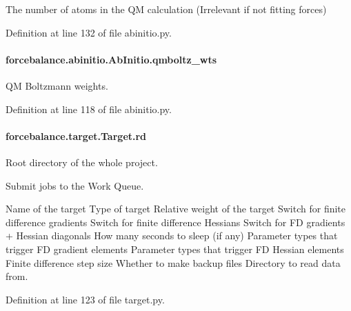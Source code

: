 The number of atoms in the Q\-M calculation (Irrelevant if not fitting forces) 



Definition at line 132 of file abinitio.\-py.

\hypertarget{classforcebalance_1_1abinitio_1_1AbInitio_a06ec6b12d81791ca94f599f41e56335a}{
\paragraph[{qmboltz\-\_\-wts}]{\setlength{\rightskip}{0pt plus 5cm}forcebalance.\-abinitio.\-Ab\-Initio.\-qmboltz\-\_\-wts}}\label{classforcebalance_1_1abinitio_1_1AbInitio_a06ec6b12d81791ca94f599f41e56335a}


Q\-M Boltzmann weights. 



Definition at line 118 of file abinitio.\-py.

\hypertarget{classforcebalance_1_1target_1_1Target_a4edb69fbde792e9f2f27e54b7c978c8e}{
\paragraph[{rd}]{\setlength{\rightskip}{0pt plus 5cm}forcebalance.\-target.\-Target.\-rd\hspace{0.3cm}{\ttfamily [inherited]}}}\label{classforcebalance_1_1target_1_1Target_a4edb69fbde792e9f2f27e54b7c978c8e}


Root directory of the whole project. 

Submit jobs to the Work Queue.

Name of the target Type of target Relative weight of the target Switch for finite difference gradients Switch for finite difference Hessians Switch for F\-D gradients + Hessian diagonals How many seconds to sleep (if any) Parameter types that trigger F\-D gradient elements Parameter types that trigger F\-D Hessian elements Finite difference step size Whether to make backup files Directory to read data from.

Definition at line 123 of file target.\-py.

